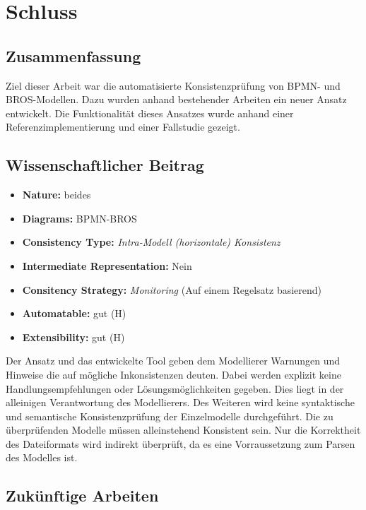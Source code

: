 \chapter{Schluss}

\section{Zusammenfassung}

Ziel dieser Arbeit war die automatisierte Konsistenzprüfung von BPMN- und BROS-Modellen.
Dazu wurden anhand bestehender Arbeiten ein neuer Ansatz entwickelt.
Die Funktionalität dieses Ansatzes wurde anhand einer Referenzimplementierung und einer Fallstudie gezeigt.  

\section{Wissenschaftlicher Beitrag}

\begin{itemize}
    \item \textbf{Nature:} beides
    \item \textbf{Diagrams:} BPMN-BROS
    \item \textbf{Consistency Type:} \emph{Intra-Modell (horizontale) Konsistenz}
    \item \textbf{Intermediate Representation:} Nein
    \item \textbf{Consitency Strategy:} \emph{Monitoring} (Auf einem Regelsatz basierend)
    \item \textbf{Automatable:} gut (H)
    \item \textbf{Extensibility:} gut (H)
\end{itemize}

Der Ansatz und das entwickelte Tool geben dem Modellierer Warnungen und Hinweise die auf mögliche Inkonsistenzen deuten.
Dabei werden explizit keine Handlungsempfehlungen oder Lösungsmöglichkeiten gegeben.
Dies liegt in der alleinigen Verantwortung des Modellierers.
Des Weiteren wird keine syntaktische und semantische Konsistenzprüfung der Einzelmodelle durchgeführt.
Die zu überprüfenden Modelle müssen alleinstehend Konsistent sein.
Nur die Korrektheit des Dateiformats wird indirekt überprüft, da es eine Vorraussetzung zum Parsen des Modelles ist.

\section{Zukünftige Arbeiten}

